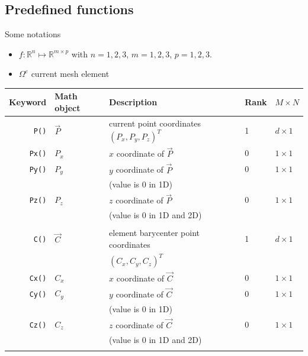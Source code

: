 \documentclass[11pt]{article}
\begin{document}
\subsection{Predefined functions}

Some notations
\begin{itemize}
\item $f: \mathbb{R}^n \mapsto \mathbb{R}^{m\times p}$  with $n=1,2,3$, $m=1,2,3$, $p=1,2,3$.
\item $\Omega^e$ current mesh element
\end{itemize}


\begin{longtable}[c]{rllll}
  Keyword & Math object & Description & Rank & $M \times N$\\\hline\hline

  \endhead
  \lstinline!P()! & $\overrightarrow{P}$ & current point coordinates $(P_x, P_y, P_z)^T$ & 1 & $d \times 1$ \\

  \lstinline!Px()! & $P_x$ & $x$ coordinate of $\overrightarrow{P}$ & 0 & $1 \times 1$\\

  \lstinline!Py()! & $P_y$ & $y$ coordinate of $\overrightarrow{P}$ & 0 & $1 \times 1$\\
  & &  (value is 0 in 1D) & &\\

  \lstinline!Pz()! & $P_z$ & $z$ coordinate of $\overrightarrow{P}$& 0 & $1 \times 1$\\
  & &  (value is 0 in 1D and 2D)  & &\\\hline\\

  \lstinline!C()! & $\overrightarrow{C}$ & element barycenter point coordinates  & 1 & $d \times 1$ \\
  &&$(C_x, C_y, C_z)^T$&&\\

  \lstinline!Cx()! & $C_x$ & $x$ coordinate of $\overrightarrow{C}$ & 0 & $1 \times 1$\\

  \lstinline!Cy()! & $C_y$ & $y$ coordinate of $\overrightarrow{C}$ & 0 & $1 \times 1$\\
  & &  (value is 0 in 1D) & &\\

  \lstinline!Cz()! & $C_z$ & $z$ coordinate of $\overrightarrow{C}$& 0 & $1 \times 1$\\
  & &  (value is 0 in 1D and 2D)  & &\\\hline\\


\end{longtable}
\end{document}
